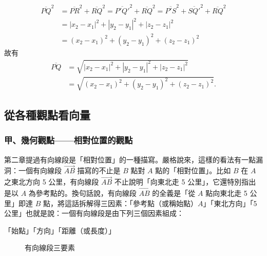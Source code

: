 \begin{align*}
\overline{PQ}^2 &= \overline{PR}^2 + \overline{RQ}^2 = \overline{P'Q'}^2 + \overline{RQ}^2 = \overline{P'S}^2 + \overline{SQ'}^2 + \overline{RQ}^2 \\
&= |x_2 - x_1|^2 + |y_2 - y_1|^2 + |z_2 - z_1|^2 \\
&= (x_2 - x_1)^2 + (y_2 - y_1)^2 + (z_2 - z_1)^2
\end{align*}
故有
\begin{align*}
\overline{PQ} &= \sqrt{|x_2 - x_1|^2 + |y_2 - y_1|^2 + |z_2 - z_1|^2} \\
&= \sqrt{(x_2 - x_1)^2 + (y_2 - y_1)^2 + (z_2 - z_1)^2}.
\end{align*}

\subsection{從各種觀點看向量}
\label{sec:b3-3-2}

\subsubsection*{甲、幾何觀點——相對位置的觀點}

第二章提過有向線段是「相對位置」的一種描寫。嚴格說來，這樣的看法有一點漏洞：一個有向線段 $\vec{AB}$ 描寫的不止是 $B$ 點對 $A$ 點的「相對位置」。比如 $B$ 在 $A$ 之東北方向 5 公里，有向線段 $\vec{AB}$ 不止說明「向東北走 5 公里」，它還特別指出是以 $A$ 為參考點的。換句話說，有向線段 $\vec{AB}$ 的全義是「從 $A$ 點向東北走 5 公里」即達 $B$ 點，將這話拆解得三因素：「參考點（或稱始點）$A$」「東北方向」「5 公里」也就是說：一個有向線段是由下列三個因素組成：
\begin{center}
「始點」「方向」「距離（或長度）」
\end{center}

\begin{figure}[H]
\centering
{}
\caption{有向線段三要素}
\label{fig:b3-fig3-5}
\end{figure}

